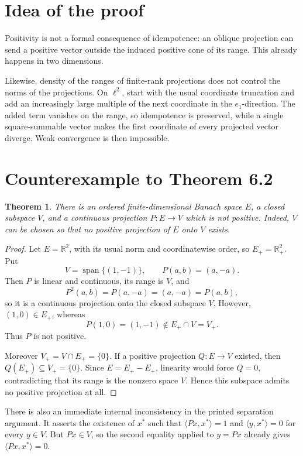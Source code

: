 \documentclass[11pt]{article}
\newtheorem{theorem}{Theorem}
\newcommand{\R}{\mathbb{R}}
\begin{document}
\clearpage
\section{Idea of the proof}

Positivity is not a formal consequence of idempotence: an oblique projection
can send a positive vector outside the induced positive cone of its range.
This already happens in two dimensions.

Likewise, density of the ranges of finite-rank projections does not control
the norms of the projections.  On \(\ell^2\), start with the usual coordinate
truncation and add an increasingly large multiple of the next coordinate in
the \(e_1\)-direction.  The added term vanishes on the range, so idempotence is
preserved, while a single square-summable vector makes the first coordinate
of every projected vector diverge.  Weak convergence is then impossible.

\section{Counterexample to Theorem 6.2}

\begin{theorem}
There is an ordered finite-dimensional Banach space \(E\), a closed subspace
\(V\), and a continuous projection \(P:E\to V\) which is not positive.
Indeed, \(V\) can be chosen so that no positive projection of \(E\) onto
\(V\) exists.
\end{theorem}

\begin{proof}
Let \(E=\R^2\), with its usual norm and coordinatewise order, so
\(E_+=\R_+^2\).  Put
\[
  V=\operatorname{span}\{(1,-1)\},
  \qquad P(a,b)=(a,-a).
\]
Then \(P\) is linear and continuous, its range is \(V\), and
\[
 P^2(a,b)=P(a,-a)=(a,-a)=P(a,b),
\]
so it is a continuous projection onto the closed subspace \(V\).  However,
\((1,0)\in E_+\), whereas
\[
 P(1,0)=(1,-1)\notin E_+\cap V=V_+.
\]
Thus \(P\) is not positive.

Moreover \(V_+=V\cap E_+=\{0\}\).  If a positive projection
\(Q:E\to V\) existed, then \(Q(E_+)\subseteq V_+=\{0\}\).  Since
\(E=E_+-E_+\), linearity would force \(Q=0\), contradicting that its range
is the nonzero space \(V\).  Hence this subspace admits no positive
projection at all.
\end{proof}

There is also an immediate internal inconsistency in the printed separation
argument.  It asserts the existence of \(x^*\) such that
\(\langle Px,x^*\rangle=1\) and \(\langle y,x^*\rangle=0\) for every
\(y\in V\).  But \(Px\in V\), so the second equality applied to \(y=Px\)
already gives \(\langle Px,x^*\rangle=0\).
\end{document}
